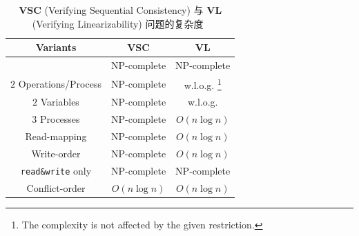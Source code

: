 
\begin{frame}{}
\end{frame}

\begin{frame}{}
  \begin{table}[h]
    \centering
    \caption{{\bf VSC} (Verifying Sequential Consistency) 与 {\bf VL} (Verifying Linearizability) 问题的复杂度~}
    \renewcommand\arraystretch{1.2}
      \begin{tabular}{|c|c|c|}
	\hline
	{\bf Variants} & {\bf VSC} & {\bf VL}
	\\ \hline \hline
	\hl{\red{General}} & \textsf{NP}-complete & \textsf{NP}-complete
	\\ \hline
	$2$ Operations/Process & \textsf{NP}-complete & w.l.o.g.
	\footnote[frame]{The complexity is not affected by the given restriction.}
	\\
	$2$ Variables & \textsf{NP}-complete & w.l.o.g.\\
	$3$ Processes & \textsf{NP}-complete & $O(n \log n)$
	\\ \hline
	Read-mapping & \textsf{NP}-complete &  $O(n \log n)$ \\
	Write-order & \textsf{NP}-complete &  $O(n \log n)$ \\
	\texttt{read\&write} only & \textsf{NP}-complete & \textsf{NP}-complete \\
	Conflict-order & $O(n \log n)$ &  $O(n \log n)$
	\\ \hline
      \end{tabular}
  \end{table}
\end{frame}

